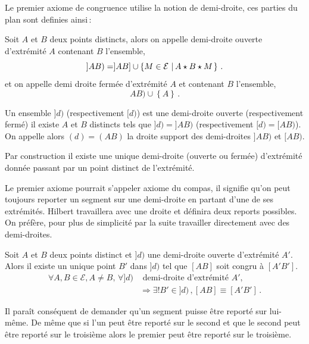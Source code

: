 Le premier axiome de congruence utilise la notion de demi-droite, ces parties du plan sont definies ainsi\,:
\begin{defi}\label{def-demidroite}
    Soit $A$ et $B$ deux points distincts, alors on appelle demi-droite ouverte d'extrémité $A$ contenant $B$ l'ensemble,
    \begin{equation*}
        ]AB) = ]AB] \cup \left\{M\in\mathcal{E}\,\left|\,A\star B \star M\right.\right\}\,.
    \end{equation*}
    et on appelle demi droite fermée d'extrémité $A$ et contenant $B$ l'ensemble,
    \begin{equation*}
        [AB) = ]AB) \cup \left\{A\right\}\,.
    \end{equation*}

    Un ensemble $]d)$ (respectivement $[d)$) est une demi-droite ouverte (respectivement fermé) \ssi il existe $A$ et $B$ distincts tels que $]d)=]AB)$ (respectivement $[d)=[AB)$). On appelle alors $(d)=(AB)$ la droite support des demi-droites $]AB)$ et $[AB)$. 
\end{defi}
\begin{rema}
    Par construction il existe une unique demi-droite (ouverte ou fermée) d'extrémité donnée passant par un point distinct de l'extrémité.
\end{rema}
Le premier axiome pourrait s'appeler axiome du compas, il signifie qu'on peut toujours reporter un segment sur une demi-droite en partant d'une de ses extrémités. Hilbert travaillera avec une droite et définira deux reports possibles. On préfère, pour plus de simplicité par la suite travailler directement avec des demi-droites.
\begin{axi}\label{axi-C1}
    Soit $A$ et $B$ deux points distinct et $]d)$ une demi-droite ouverte d'extrémité $A'$. Alors il existe un unique point $B'$ dans $]d)$ tel que $[AB]$ soit congru à $[A'B']$.
    \begin{align*}
        \forall A,B\in\mathcal{E}, A\neq B,\, \forall ]d) &\text{ demi-droite d'extrémité } A',\, \\
        &\Rightarrow \exists ! B'\in ]d)\,, [AB] \equiv [A'B']\,.
    \end{align*}
\end{axi}
Il paraît conséquent de demander qu'un segment puisse être reporté sur lui-même. De même que si l'un peut être reporté sur le second et que le second peut être reporté sur le troisième alors le premier peut être reporté sur le troisième.
